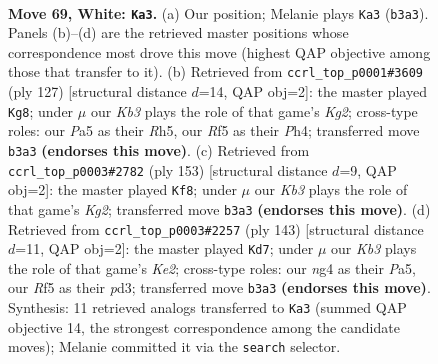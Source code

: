 \documentclass[11pt]{article}
\begin{document}
\clearpage

\begin{figure}[p]\centering
\begin{subfigure}{0.46\textwidth}\centering
\resizebox{\linewidth}{!}{%
\newchessgame
\chessboard[
  setfen={7k/8/1P6/P4R2/6n1/1K6/7r/8 w - - 1 69},
  showmover=false,
  pgfstyle=straightmove, color=movearrow, markmove={b3-a3}
]}
\caption{}
\end{subfigure}\hfill
\begin{subfigure}{0.46\textwidth}\centering
\resizebox{\linewidth}{!}{%
\newchessgame
\chessboard[
  setfen={8/6k1/8/7r/R4K1p/7P/8/8 b - - 5 64},
  showmover=false,
  pgfstyle=straightmove, color=movearrow, markmove={g7-g8}
]}
\caption{}
\end{subfigure}
\\[4pt]
\begin{subfigure}{0.46\textwidth}\centering
\resizebox{\linewidth}{!}{%
\newchessgame
\chessboard[
  setfen={8/6k1/8/1R4K1/8/p5N1/8/r7 b - - 4 77},
  showmover=false,
  pgfstyle=straightmove, color=movearrow, markmove={g7-f8}
]}
\caption{}
\end{subfigure}\hfill
\begin{subfigure}{0.46\textwidth}\centering
\resizebox{\linewidth}{!}{%
\newchessgame
\chessboard[
  setfen={8/4k3/6R1/p7/8/3P4/6K1/r7 b - - 7 72},
  showmover=false,
  pgfstyle=straightmove, color=movearrow, markmove={e7-d7}
]}
\caption{}
\end{subfigure}
\caption{\textbf{Move 69, White: \texttt{Ka3}.} (a) Our position; Melanie plays \texttt{Ka3} (\texttt{b3a3}). Panels (b)--(d) are the retrieved master positions whose correspondence most drove this move (highest QAP objective among those that transfer to it). (b) Retrieved from \texttt{ccrl\_top\_p0001\#3609} (ply 127) [structural distance $d$=14, QAP obj=2]: the master played \texttt{Kg8}; under $\mu$ our \emph{Kb3} plays the role of that game's \emph{Kg2}; cross-type roles: our \emph{P}a5 as their \emph{R}h5, our \emph{R}f5 as their \emph{P}h4; transferred move \texttt{b3a3} \textbf{(endorses this move)}. (c) Retrieved from \texttt{ccrl\_top\_p0003\#2782} (ply 153) [structural distance $d$=9, QAP obj=2]: the master played \texttt{Kf8}; under $\mu$ our \emph{Kb3} plays the role of that game's \emph{Kg2}; transferred move \texttt{b3a3} \textbf{(endorses this move)}. (d) Retrieved from \texttt{ccrl\_top\_p0003\#2257} (ply 143) [structural distance $d$=11, QAP obj=2]: the master played \texttt{Kd7}; under $\mu$ our \emph{Kb3} plays the role of that game's \emph{Ke2}; cross-type roles: our \emph{n}g4 as their \emph{P}a5, our \emph{R}f5 as their \emph{p}d3; transferred move \texttt{b3a3} \textbf{(endorses this move)}. Synthesis: 11 retrieved analogs transferred to \texttt{Ka3} (summed QAP objective 14, the strongest correspondence among the candidate moves); Melanie committed it via the \texttt{search} selector.}
\label{fig:thought-m136}
\end{figure}
\end{document}
